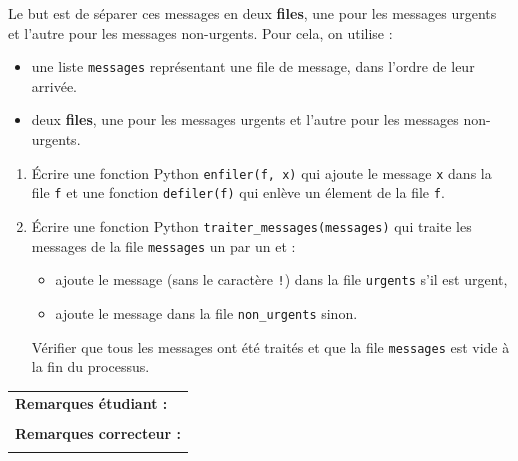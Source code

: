 \documentclass[a4paper,11pt]{article}
\begin{document}
Le but est de séparer ces messages en deux \textbf{files}, une pour les messages urgents et l'autre pour les messages non-urgents. 
Pour cela, on utilise :
\begin{itemize}
    \item une liste \texttt{messages} représentant une file de message, dans l'ordre de leur arrivée. 
   \item deux \textbf{files}, une pour les messages urgents et l'autre pour les messages non-urgents. 
\end{itemize}

\begin{enumerate}
    \item Écrire une fonction Python \texttt{enfiler(f, x)} qui ajoute le message  \texttt{x} dans la file  \texttt{f} et une fonction \texttt{defiler(f)} qui enlève un élement de la file \texttt{f}. 
    \item Écrire une fonction Python \texttt{traiter\_messages(messages)} qui traite les messages de la file \texttt{messages} un par un et :
    \begin{itemize}
        \item ajoute le message (sans le caractère \texttt{!}) dans la file \texttt{urgents} s'il est urgent,
        \item ajoute le message dans la file \texttt{non\_urgents} sinon.
    \end{itemize}
Vérifier que tous les messages ont été traités et que la file \texttt{messages} est vide à la fin du processus.
\end{enumerate}



\begin{table}[h!]
\centering
\renewcommand{\arraystretch}{1.4}
\begin{tabular}{|p{15cm}|}
\hline
\textbf{Remarques étudiant :} \\
 \\
\hline
\textbf{Remarques correcteur :} \\
 \\
\hline
\end{tabular}
\end{table}
\end{document}
